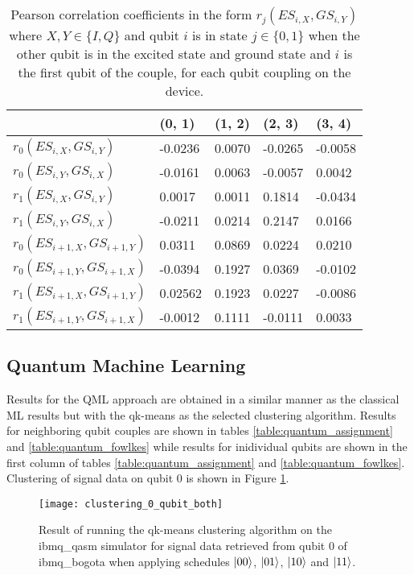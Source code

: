 \documentclass[conference]{IEEEtran}
\begin{document}
\begin{table}[]
\begin{tabular}{lllll}
   & (0, 1)     & (1, 2)     & (2, 3)     & (3, 4)     \\ \hline
$ r_0(ES_{i,X}, GS_{i,Y}) $     & -0.0236 & 0.0070 & -0.0265 & -0.0058 \\ \hline
$ r_0(ES_{i,Y}, GS_{i,X}) $     & -0.0161 & 0.0063 & -0.0057 & 0.0042  \\ \hline
$ r_1(ES_{i,X}, GS_{i,Y}) $     & 0.0017  & 0.0011 & 0.1814  & -0.0434 \\ \hline
$ r_1(ES_{i,Y}, GS_{i,X}) $     & -0.0211 & 0.0214 & 0.2147  & 0.0166  \\ \hline
$ r_0(ES_{i+1,X}, GS_{i+1,Y}) $ & 0.0311  & 0.0869 & 0.0224  & 0.0210  \\ \hline
$ r_0(ES_{i+1,Y}, GS_{i+1,X}) $ & -0.0394 & 0.1927 & 0.0369  & -0.0102 \\ \hline
$ r_1(ES_{i+1,X}, GS_{i+1,Y}) $ & 0.02562 & 0.1923 & 0.0227  & -0.0086 \\ \hline
$ r_1(ES_{i+1,Y}, GS_{i+1,X}) $ & -0.0012 & 0.1111 & -0.0111 & 0.0033
\end{tabular}
\caption{Pearson correlation coefficients in the form $ r_j(ES_{i,X}, GS_{i,Y}) $ where $ X,Y \in \{I,Q\} $ and qubit $ i $ is in state $ j \in \{0,1\} $ when the other qubit is in the excited state and ground state and $ i $ is the first qubit of the couple, for each qubit coupling on the device.}
\label{table:pearson_correlation}
\end{table}

\subsection{Quantum Machine Learning}

Results for the QML approach are obtained in a similar manner as the classical ML results but with the qk-means as the selected clustering algorithm. Results for neighboring qubit couples are shown in tables \ref{table:quantum_assignment} and \ref{table:quantum_fowlkes} while results for inidividual qubits are shown in the first column of tables \ref{table:quantum_assignment} and \ref{table:quantum_fowlkes}. Clustering of signal data on qubit 0 is shown in Figure \ref{fig:clustering}.

\begin{figure}
\centering
\texttt{[image: clustering\_0\_qubit\_both]}
\caption{Result of running the qk-means clustering algorithm on the ibmq\_qasm simulator for signal data retrieved from qubit 0 of ibmq\_bogota when applying schedules \(\ket{00}\), \(\ket{01}\), \(\ket{10}\) and \(\ket{11}\).}
\label{fig:clustering}
\end{figure}
\end{document}

